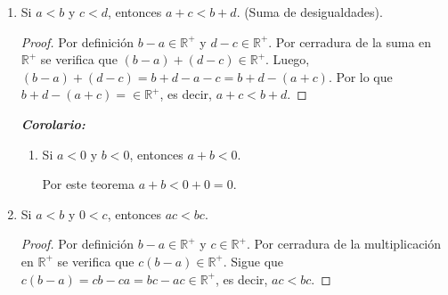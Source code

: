 \documentclass[11pt]{article}
\newcommand{\R}{\mathbb{R}}
\newcommand{\bfit}[1]{\textbf{\textit{#1}}}
\begin{document}
\begin{enumerate}[label=\alph*)]
    \item Si $a<b$ y $c < d$, entonces $a+c<b+d$. (Suma de desigualdades).
    \vspace{-1em}\begin{proof} 
    Por definición $b-a\in \R^+$ y $d-c\in \R^+$. Por cerradura de la suma en $\R^+$ se verifica que $(b-a)+(d-c)\in \R^+$. Luego, $(b-a)+(d-c)=b+d-a-c=b+d-(a+c)$. Por lo que $b+d-(a+c)=\in \R^+$, es decir, $a+c<b+d$.
    \end{proof} \vspace{-1em}

    \bfit{Corolario:}\begin{enumerate}[label=\roman*)]
%
        \item Si $a<0$ y $b<0$, entonces $a+b<0$.%
        
        Por este teorema $a+b<0+0=0$.
    \end{enumerate}

    \item Si $a<b$ y $0<c$, entonces $ac<bc$.%
    
    \vspace{-1em}\begin{proof} 
        Por definición $b-a \in\R^+$ y $c \in\R^+$. Por cerradura de la multiplicación en $\R^+$ se verifica que $c(b-a) \in\R^+$. Sigue que $c(b-a)=cb-ca=bc-ac \in\R^+$, es decir, $ac<bc$.    
    \end{proof} \vspace{-1em}
%


\end{enumerate}
\end{document}
